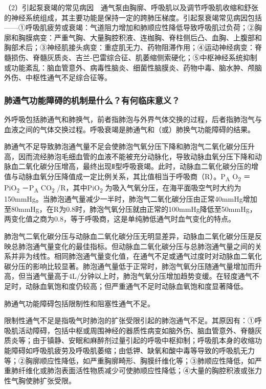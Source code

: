 （2）引起泵衰竭的常见病因　通气泵由胸廓、呼吸肌以及调节呼吸肌收缩和舒张的神经系统组成，其主要功能是保持一定的跨肺压梯度。引起泵衰竭常见病因包括------①呼吸肌疲劳或衰竭：气道阻力增加和肺顺应性降低导致呼吸肌过负荷；②胸廓和胸膜病变：严重气胸、大量胸腔积液、连枷胸、脊柱侧后凸、血胸、上腹部和胸部术后；③神经肌接头病变：重症肌无力、药物阻滞作用；④运动神经病变：脊髓损伤、脊髓灰质炎、吉兰-巴雷综合征、肌萎缩侧索硬化；⑤中枢神经系统抑制或功能紊乱：脑血管意外、病毒性脑炎、细菌性脑膜炎、药物中毒、脑水肿、颅脑外伤、中枢性通气不足综合征等。

\subsubsection{肺通气功能障碍的机制是什么？有何临床意义？}

外呼吸包括肺通气和肺换气，前者指肺泡与外界气体交换的过程，后者指肺泡气与血液之间的气体交换过程。呼吸衰竭是肺通气和（或）肺换气功能障碍的结果。

肺通气不足导致肺泡通气量不足会使肺泡气氧分压下降和肺泡气二氧化碳分压升高，因而流经肺泡毛细血管的血液不能被充分动脉化，导致动脉血氧分压下降和动脉血二氧化碳分压增高，最终出现Ⅱ型呼吸衰竭。此时，动脉血二氧化碳分压的增值与动脉血氧分压降值成一定比例关系，其比值相当于呼吸商（R）。P\textsubscript{A}
O\textsubscript{2} ＝PiO\textsubscript{2} －P\textsubscript{A}
CO\textsubscript{2} /R，其中PiO\textsubscript{2}
为吸入气氧分压，在海平面吸空气时大约为150mmHg。当肺泡通气量减少一半时，肺泡气二氧化碳分压由正常40mmHg增加至80mmHg，在R为0.8时，肺泡气氧分压就由正常的100mmHg降低至50mmHg，两变化值之商为0.8，等于呼吸商，这是单纯肺低通气时血气变化的特点。

肺泡气二氧化碳分压与动脉血二氧化碳分压无明显差异，动脉血二氧化碳分压是反映总肺泡通气量变化的最佳指标。但动脉血二氧化碳分压与总肺泡通气量之间的关系并非为线性。相同肺泡通气量变化值，在通气不足或通气过度时对动脉血二氧化碳分压的影响比较显著。肺泡通气量低于正常时，肺泡气氧分压随通气量增加而升高，但当通气量高于4L/分钟以上时，肺泡气氧分压增加趋势变缓。在轻度通气不足时，动脉血氧饱和度仍较高；但严重通气不足时动脉血氧饱和度显著降低。

肺通气功能障碍包括限制性和阻塞性通气不足。

限制性通气不足是指吸气时肺泡的扩张受限引起的肺泡通气不足。其原因有：①呼吸肌活动障碍，包括中枢或周围神经的器质性病变如脑外伤、脑血管意外、脊髓灰质炎等；由于镇静、安眠和麻醉剂过量引起的呼吸中枢抑制；呼吸肌本身的收缩功能障碍如呼吸肌疲劳及呼吸肌萎缩；由低钾、缺氧和酸中毒等导致的呼吸肌无力等；②胸廓顺应性降低，如严重胸廓畸形、胸膜纤维化等；③肺顺应性降低，如严重肺纤维化或肺泡表面活性物质减少可使肺顺应性降低；④大量的胸腔积液或张力性气胸使肺扩张受限。

